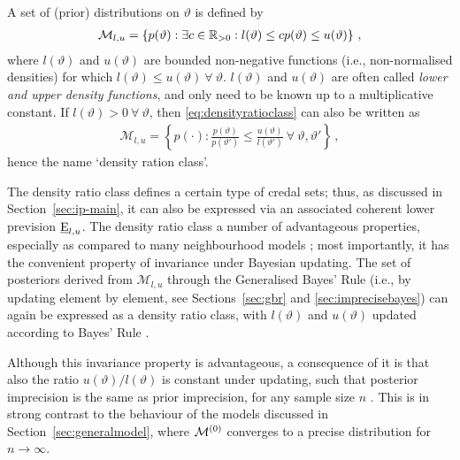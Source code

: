 A set of (prior) distributions on $\vartheta$ is defined by %
\begin{align}\label{eq:densityratioclass}
\mathcal{M}_{l,u} = \left\{ p(\vartheta) :
\exists c \in \mathbb{R}_{>0}: l(\vartheta) \le c p(\vartheta) \le u(\vartheta)\right\}\,,
\end{align}
where $l(\vartheta)$ and $u(\vartheta)$ are bounded non-negative functions (i.e., non-normalised densities)	
for which $l(\vartheta) \le u(\vartheta)\ \forall\ \vartheta$.
$l(\vartheta)$ and $u(\vartheta)$ are often called \emph{lower and upper density functions},
and only need to be known up to a multiplicative constant.
If $l(\vartheta)>0\ \forall\ \vartheta$, then \eqref{eq:densityratioclass} can also be written as
\begin{align*}
\mathcal{M}_{l,u} = \left\{ p(\cdot) :
\frac{p(\vartheta)}{p(\vartheta')} \le \frac{u(\vartheta)}{l(\vartheta')}\ \forall\ \vartheta, \vartheta' \right\}\,,
\end{align*}
hence the name `density ration class'.

The density ratio class defines a certain type of credal sets;
thus, as discussed in Section~\ref{sec:ip-main},
it can also be expressed via an associated coherent lower prevision $\underline{\operatorname{E}}_{l,u}$.
The density ratio class a number of advantageous properties,
especially as compared to many neighbourhood models
\parencite[see, e.g.,][\S 2.3]{2011:rinderknecht};
most importantly, it has the convenient property of invariance under Bayesian updating.
The set of posteriors derived from $\mathcal{M}_{l,u}$
through the Generalised Bayes' Rule (i.e., by updating element by element,
see Sections~\ref{sec:gbr} and \ref{sec:imprecisebayes})
can again be expressed as a density ratio class,
with $l(\vartheta)$ and $u(\vartheta)$ updated according to Bayes' Rule \parencite{1981:derobertis}.

Although this invariance property is advantageous,
a consequence of it is that also the ratio $u(\vartheta)/l(\vartheta)$
is constant under updating, such that posterior imprecision is the same as prior imprecision,
for any sample size $n$ \parencite[see, e.g.,][\S 4.2.2]{2011:rinderknecht:diss}.
This is in strong contrast to the behaviour of the models discussed in Section~\ref{sec:generalmodel},
where $\mathcal{M}^{(0)}$ converges to a precise distribution for $n \to \infty$. 


